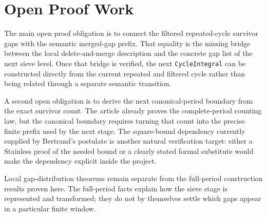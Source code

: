 \section{Open Proof Work}
\label{sec:open-proof-work}

The main open proof obligation is to connect the filtered repeated-cycle
survivor gaps with the semantic merged-gap prefix. That equality is the
missing bridge between the local delete-and-merge description and the
concrete gap list of the next sieve level. Once that bridge is verified,
the next \texttt{CycleIntegral} can be constructed directly from the
current repeated and filtered cycle rather than being related through a
separate semantic transition.

A second open obligation is to derive the next canonical-period boundary
from the exact survivor count. The article already proves the
complete-period counting law, but the canonical boundary requires
turning that count into the precise finite prefix used by the next
stage. The square-bound dependency currently supplied by Bertrand's
postulate is another natural verification target: either a Stainless
proof of the needed bound or a clearly stated formal substitute would
make the dependency explicit inside the project.

Local gap-distribution theorems remain separate from the full-period
construction results proven here. The full-period facts explain how the
sieve stage is represented and transformed; they do not by themselves
settle which gaps appear in a particular finite window.

